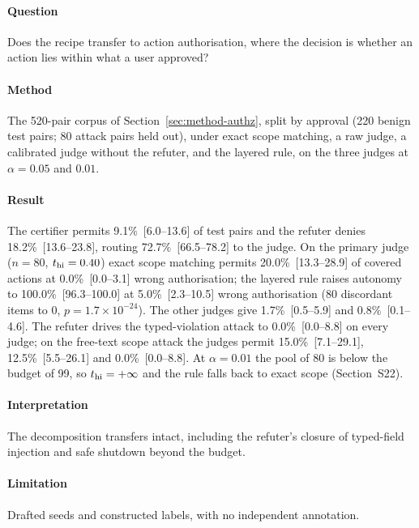 \paragraph{Question} Does the recipe transfer to action authorisation, where the decision is whether an action lies within what a user approved?

\paragraph{Method} The 520-pair corpus of Section~\ref{sec:method-authz}, split by approval (220 benign test pairs; 80 attack pairs held out), under exact scope matching, a raw judge, a calibrated judge without the refuter, and the layered rule, on the three judges at $\alpha=0.05$ and $0.01$.

\paragraph{Result} The certifier permits 9.1\%~[6.0--13.6] of test pairs and the refuter denies 18.2\%~[13.6--23.8], routing 72.7\%~[66.5--78.2] to the judge. On the primary judge ($n=80$, $t_{\mathrm{hi}}=0.40$) exact scope matching permits 20.0\%~[13.3--28.9] of covered actions at 0.0\%~[0.0--3.1] wrong authorisation; the layered rule raises autonomy to 100.0\%~[96.3--100.0] at 5.0\%~[2.3--10.5] wrong authorisation (80 discordant items to 0, $p=1.7\times10^{-24}$). The other judges give 1.7\%~[0.5--5.9] and 0.8\%~[0.1--4.6]. The refuter drives the typed-violation attack to 0.0\%~[0.0--8.8] on every judge; on the free-text scope attack the judges permit 15.0\%~[7.1--29.1], 12.5\%~[5.5--26.1] and 0.0\%~[0.0--8.8]. At $\alpha=0.01$ the pool of 80 is below the budget of 99, so $t_{\mathrm{hi}}=+\infty$ and the rule falls back to exact scope (Section~S22).

\paragraph{Interpretation} The decomposition transfers intact, including the refuter's closure of typed-field injection and safe shutdown beyond the budget.

\paragraph{Limitation} Drafted seeds and constructed labels, with no independent annotation.
